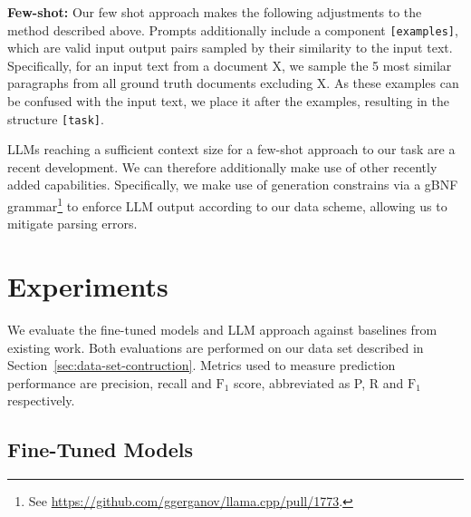 \textbf{Few-shot:} Our few shot approach makes the following adjustments to the method described above. Prompts additionally include a component \texttt{[examples]}, which are valid input output pairs sampled by their similarity to the input text. Specifically, for an input text from a document X, we sample the 5 most similar paragraphs from all ground truth documents excluding X. As these examples can be confused with the input text, we place it after the examples, resulting in the structure \texttt{[task]\allowbreak[format]\allowbreak[examples]}.

LLMs reaching a sufficient context size for a few-shot approach to our task are a recent development. We can therefore additionally make use of other recently added capabilities. Specifically, we make use of generation constrains via a gBNF grammar\footnote{See \url{https://github.com/ggerganov/llama.cpp/pull/1773}.} to enforce LLM output according to our data scheme, allowing us to mitigate parsing errors.

\section{Experiments}\label{sec:experiments}

We evaluate the fine-tuned models and LLM approach against baselines from existing work. Both evaluations are performed on our data set described in Section~\ref{sec:data-set-contruction}. Metrics used to measure prediction performance are precision, recall and $\text{F}_1$ score, abbreviated as P, R and $\text{F}_1$ respectively.

\subsection{Fine-Tuned Models}


